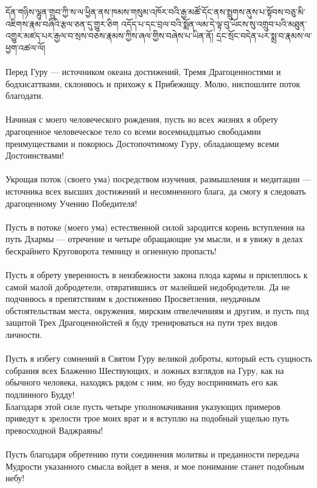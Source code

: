 དོན་གཉིས་ལྷུན་གྲུབ་ཀྱི་ས་ལ་ཕྱིན་ནས་ཁམས་གསུམ་འཁོར་བའི་རྒྱ་མཚོ་དོང་ནས་སྤྲུགས་ནུས་པ་སྟོབས་བཅུ་མི་འཇིགས་རྣམ་བཞིའི་རྩལ་ཅན་དུ་གྱུར་ཅིག
འདོད་པ་དང་བྲལ་བའི་སྨོན་ལམ་དེ་ལྟ་བུ་ཡོངས་སུ་འགྲུབ་པའི་མཐུན་འགྱུར་མཛད་པར་རྒྱལ་བ་སྲས་བཅས་རྣམས་ཀྱིས་ཞལ་གྱིས་བཞེས་པ་ཡིན་ནོ།
དྲང་སྲོང་བདེན་པར་སྨྲ་བ་རྣམས་ལ་ཕྱག་འཚལ་ལོ།\\
\\
\ru
Перед Гуру — источником океана достижений,
Тремя Драгоце\-нностями и бодхисаттвами,
склоняюсь и прихожу к Прибежищу.
Молю, ниспошлите поток благодати.\\
\\
Начиная с моего человеческого рождения,
пусть во всех жизнях я обрету драгоценное человеческое тело
со всеми восемнадцатью свободамии преимуществами
и покорюсь Дос\-топочтимому Гуру,
обладающему всеми Достоинствами!\\
\\
Укрощая поток (своего ума) посредством изучения,
размышле\-ния и медитации — источника всех
высших достижений и несомненного блага,
да смогу я следовать драгоценному Учению Победителя!\\
\\
Пусть в потоке (моего ума) естественной силой
зародится корень вступления на путь Дхармы —
отречение и четыре обращающие ум мысли,
и я увижу в делах бескрайнего Круго\-ворота
темницу и огненную пропасть!\\
\\
Пусть я обрету уверенность в неизбежности закона плода кармы
и прилеплюсь к самой малой добродетели,
отвратившись от малейшей недобродетели.
Да не подчинюсь я препятствиям к достижению Просветления,
неудачным обстоятельствам места, окружения,
мирским отвелечениям и другим, и пусть под защитой
Трех Драгоценнойстей я буду тренироваться на пути трех видов личности.\\
\\
Пусть я избегу сомнений в Святом Гуру великой доброты,
который есть сущность собрания всех Блаженно Шествующих,
и ложных взглядов на Гуру, как на обычного человека,
находясь рядом с ним, но буду воспринимать его как подлинного Будду!
\\
Благодаря этой силе пусть четыре уполномачивания
указующих примеров приведут к зрелости трое моих врат
и я вступлю на подобный ущелью путь превосходной Ваджраяны!\\
\\
Пусть благодаря обретению пути соединения молитвы и преда\-нности
передача Мудрости указанного смысла войдет в меня,
и мое понимание станет подобным небу!\\

